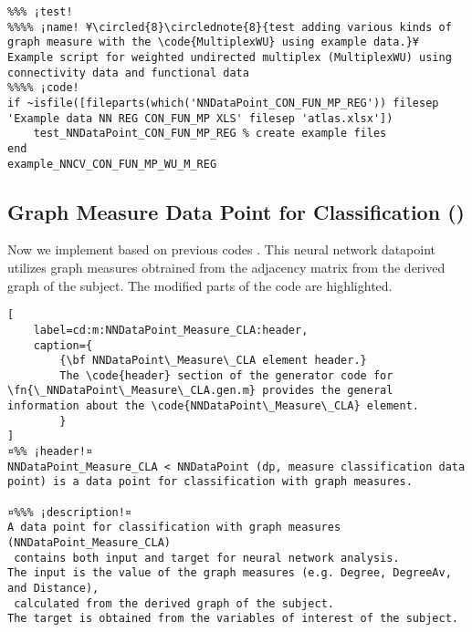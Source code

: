 \documentclass{tufte-handout}
\begin{document}
\begin{lstlisting}
%%% ¡test!
%%%% ¡name! ¥\circled{8}\circlednote{8}{test adding various kinds of graph measure with the \code{MultiplexWU} using example data.}¥
Example script for weighted undirected multiplex (MultiplexWU) using connectivity data and functional data
%%%% ¡code!
if ~isfile([fileparts(which('NNDataPoint_CON_FUN_MP_REG')) filesep 'Example data NN REG CON_FUN_MP XLS' filesep 'atlas.xlsx'])
    test_NNDataPoint_CON_FUN_MP_REG % create example files
end
example_NNCV_CON_FUN_MP_WU_M_REG

\end{lstlisting}

\clearpage
\subsection{Graph Measure Data Point for Classification ()}

Now we implement  based on previous codes .
This neural network datapoint utilizes graph measures obtrained from the adjacency matrix from the derived graph of the subject. 
The modified parts of the code are highlighted.

\begin{lstlisting}[
	label=cd:m:NNDataPoint_Measure_CLA:header,
	caption={
		{\bf NNDataPoint\_Measure\_CLA element header.}
		The \code{header} section of the generator code for \fn{\_NNDataPoint\_Measure\_CLA.gen.m} provides the general information about the \code{NNDataPoint\_Measure\_CLA} element.
		}
]
¤%% ¡header!¤
NNDataPoint_Measure_CLA < NNDataPoint (dp, measure classification data point) is a data point for classification with graph measures.

¤%%% ¡description!¤
A data point for classification with graph measures (NNDataPoint_Measure_CLA) 
 contains both input and target for neural network analysis.
The input is the value of the graph measures (e.g. Degree, DegreeAv, and Distance), 
 calculated from the derived graph of the subject.
The target is obtained from the variables of interest of the subject.
\end{lstlisting}
\end{document}
